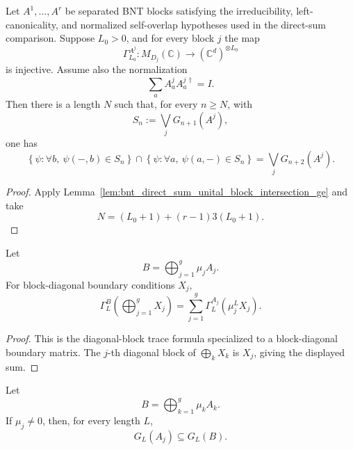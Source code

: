 \begin{lemma}
    \label{lem:bnt_direct_sum_unital_block_intersection}
    \leanok
    Let \(A^1,\ldots,A^r\) be separated BNT blocks satisfying the irreducibility,
    left-canonicality, and normalized self-overlap hypotheses used in the
    direct-sum comparison. Suppose \(L_0>0\), and for every block \(j\) the map
    \[
        \Gamma_{L_0}^{A^j}:M_{D_j}(\mathbb C)\to
        (\mathbb C^d)^{\otimes L_0}
    \]
    is injective. Assume also the normalization
    \[
        \sum_a A^j_aA^{j\,\dagger}_a=I .
    \]
    Then there is a length \(N\) such that, for every \(n\ge N\), with
    \[
        S_n:=\bigvee_jG_{n+1}(A^j),
    \]
    one has
    \[
        \left\{\psi:\forall b,\ \psi(-,b)\in S_n\right\}
        \cap
        \left\{\psi:\forall a,\ \psi(a,-)\in S_n\right\}
        =
        \bigvee_jG_{n+2}(A^j).
    \]
\end{lemma}

\begin{proof}
    \leanok
    Apply Lemma~\ref{lem:bnt_direct_sum_unital_block_intersection_ge} and take
    \[
        N=(L_0+1)+(r-1)3(L_0+1).
    \]
\end{proof}

\begin{lemma}
    \label{lem:block_diagonal_boundary_condition_sum}
    \leanok
    Let
    \[
        B=\bigoplus_{j=1}^g\mu_jA_j.
    \]
    For block-diagonal boundary conditions \(X_j\),
    \[
        \Gamma_L^B\!\left(\bigoplus_{j=1}^g X_j\right)
        =
        \sum_{j=1}^g\Gamma_L^{A_j}(\mu_j^LX_j).
    \]
\end{lemma}

\begin{proof}
    \leanok
    This is the diagonal-block trace formula specialized to a block-diagonal
    boundary matrix.  The \(j\)-th diagonal block of
    \(\bigoplus_kX_k\) is \(X_j\), giving the displayed sum.
\end{proof}

\begin{lemma}
    \label{lem:local_ground_space_block_le_assembled}
    \leanok
    Let
    \[
        B=\bigoplus_{k=1}^g\mu_kA_k.
    \]
    If \(\mu_j\ne0\), then, for every length \(L\),
    \[
        G_L(A_j)\subseteq G_L(B).
    \]
\end{lemma}

